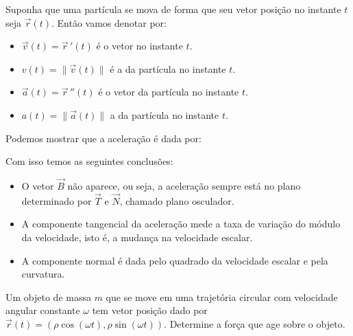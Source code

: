 \newpage



Suponha que uma partícula se mova de forma que seu vetor posição no instante $t$ seja $\vec{r}(t)$. Então vamos denotar por:
\begin{itemize}
	\item $\vec{v}(t)=\vec{r}\,'(t)$ é o vetor  no instante $t$.
	\item $v(t)=\|\vec{v}(t)\|$ é a  da partícula no instante $t$.
	\item $\vec{a}(t)=\vec{r}\,''(t)$ é o vetor  da partícula no instante $t$.
	\item $a(t)=\|\vec{a}(t)\|$ a  da partícula no instante $t$.
\end{itemize}


Podemos mostrar que  a aceleração é dada por:

\begin{center}
\end{center}



\newpage
Com isso temos as seguintes conclusões:
\begin{itemize}
\item O vetor $\vec{B}$ não aparece, ou seja, a aceleração sempre está no plano determinado por $\vec{T}$ e $\vec{N}$, chamado {\color{blue} plano osculador}.


\item A {\color{red}componente tangencial} da aceleração mede a taxa de variação do módulo da  velocidade, isto é, a {\color{red}mudança na velocidade escalar}.

\item A {\color{blue}componente normal} é dada pelo quadrado da velocidade escalar e pela curvatura.
\end{itemize}

\begin{exeb}{}{}
Um objeto de massa $m$ que se move em uma trajetória circular com velocidade angular constante $\omega$ tem vetor posição dado por $\vec{r}(t)=(\rho\cos (\omega t), \rho\sin (\omega t)).$ Determine a força que age sobre o objeto.
\end{exeb}

\newpage


